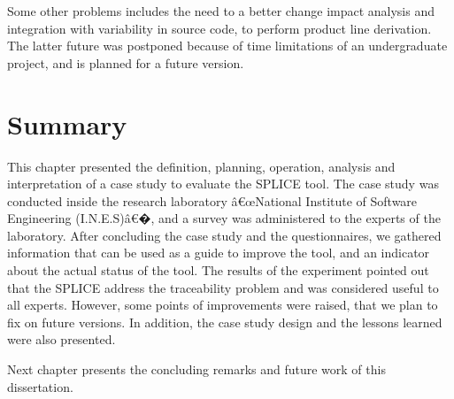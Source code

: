 Some other problems includes the need to a better change impact analysis and integration with variability in source code, to perform product line derivation. The latter future was postponed because of time limitations of an undergraduate project, and is planned for a future version.


\section{Summary}
\label{sc:expsummary}

This chapter presented the definition, planning, operation, analysis and interpretation of a case study to evaluate the \ac{SPLICE} tool. The case study was conducted inside the research laboratory â€œNational Institute of Software Engineering (I.N.E.S)â€�, and a survey was administered to the experts of the laboratory.
After concluding the case study and the questionnaires, we gathered information that can be used as a guide to improve the tool, and an indicator about the actual status of the tool. The results of the experiment pointed out that the \ac{SPLICE} address the traceability problem and was considered useful to all experts. However, some points of improvements were raised, that we plan to fix on future versions. In addition, the case study design and the lessons learned were also presented.

Next chapter presents the concluding remarks and future work of this dissertation.



